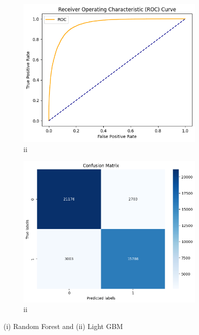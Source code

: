 \documentclass{josis}
\begin{document}
\begin{figure}
\begin{subfigure}{.24\textwidth}
    \includegraphics[width=0.95\linewidth]{ROC4.png}  
    \caption{ii}
    \label{SUBFIGURE LABEL 3}
\end{subfigure}
\begin{subfigure}{.24\textwidth}
    \centering
    \includegraphics[width=0.95\linewidth]{CM4.png}  
    \caption{ii}
    \label{SUBFIGURE LABEL 4}
\end{subfigure}
\caption{(i) Random Forest and (ii) Light GBM}
\label{FIGURE LABEL2}
\end{figure}
\end{document}
